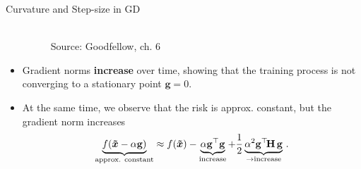 \begin{vbframe}{Curvature and Step-size in GD}
\begin{itemize}
\begin{figure}
	\centering
	\tiny{\\Source: Goodfellow, ch. 6}
\end{figure}

\vspace*{-0.1cm}

\item Gradient norms \textbf{increase} over time, showing that the training process is not converging to a stationary point $\mathbf{g} = 0$. 
\item At the same time, we observe that the risk is approx. constant, but the gradient norm increases
\vspace*{-0.2cm}
$$
\underbrace{f(\bm{\tilde{x}}-\alpha \mathbf{g})}_{\text{approx. constant}} \approx f(\bm{\tilde{x}}) - \underbrace{\alpha \mathbf{g}^\top\mathbf{g}}_{\text{increase}}+ \frac{1}{2}  \underbrace{\alpha^2 \mathbf{g}^\top\!\mathbf{H}\,\mathbf{g}}_{\to \text{increase}}  \,. 
$$ 
\end{itemize}
\end{vbframe}


	
	
	
	
	
